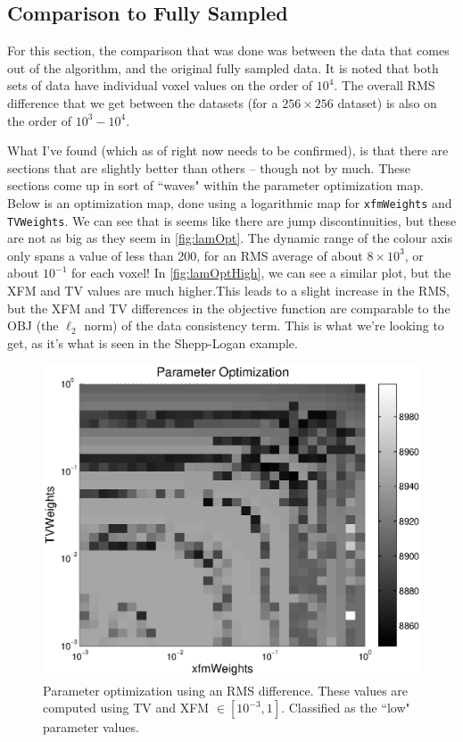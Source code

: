 \documentclass[11 pt]{article}
\begin{document}
  \subsection{Comparison to Fully Sampled}
    For this section, the comparison that was done was between the data that comes out of the algorithm, and the original fully sampled data. It is noted that both sets of data have individual voxel values on the order of $10^4$. The overall RMS difference that we get between the datasets (for a $256 \times 256$ dataset) is also on the order of $10^3 - 10^4$.

    What I've found (which as of right now needs to be confirmed), is that there are sections that are slightly better than others -- though not by much. These sections come up in sort of ``waves" within the parameter optimization map. Below is an optimization map, done using a logarithmic map for \texttt{xfmWeights} and \texttt{TVWeights}. We can see that is seems like there are jump discontinuities, but these are not as big as they seem in \autoref{fig:lamOpt}. The dynamic range of the colour axis only spans a value of less than 200, for an RMS average of about $8 \times 10^3$, or about $10^{-1}$ for each voxel! In \autoref{fig:lamOptHigh}, we can see a similar plot, but the XFM and TV values are much higher.This leads to a slight increase in the RMS, but the XFM and TV differences in the objective function are comparable to the OBJ (the $\ell_2$ norm) of the data consistency term. This is what we're looking to get, as it's what is seen in the Shepp-Logan example.

    \begin{figure}[!ht] 
      \centering
      \vspace{0pt}
      \setlength\fboxsep{0pt}
      \setlength\fboxrule{0.5pt}
      \includegraphics[trim = {0mm 0mm 0mm 0mm},clip,scale = 0.4] {Figs/CS_Code/ParamOptimization.eps}
      \caption{Parameter optimization using an RMS difference. These values are computed using TV and XFM $\in [10^{-3},1]$. Classified as the ``low" parameter values. }
      \label{fig:lamOpt}
      \end{figure}
\end{document}
